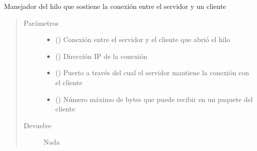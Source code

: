 \documentclass[letterpaper,10pt,spanish,openany,oneside]{sphinxmanual}
\begin{document}

\begin{fulllineitems}
\label{\detokenize{pokemonServer:pokemonServer.clientThread}}
Manejador del hilo que sostiene la conexión entre el servidor y un cliente
\begin{quote}\begin{description}
\item[{Parámetros}] \leavevmode\begin{itemize}
\item {} 
 () \textendash{} Conexión entre el servidor y el cliente que abrió el hilo

\item {} 
 () \textendash{} Dirección IP de la conexión

\item {} 
 () \textendash{} Puerto a través del cual el servidor mantiene la conexión con el cliente

\item {} 
 () \textendash{} Número máximo de bytes que puede recibir en un paquete del cliente

\end{itemize}

\item[{Devuelve}] \leavevmode
Nada

\end{description}\end{quote}

\end{fulllineitems}

\end{document}
